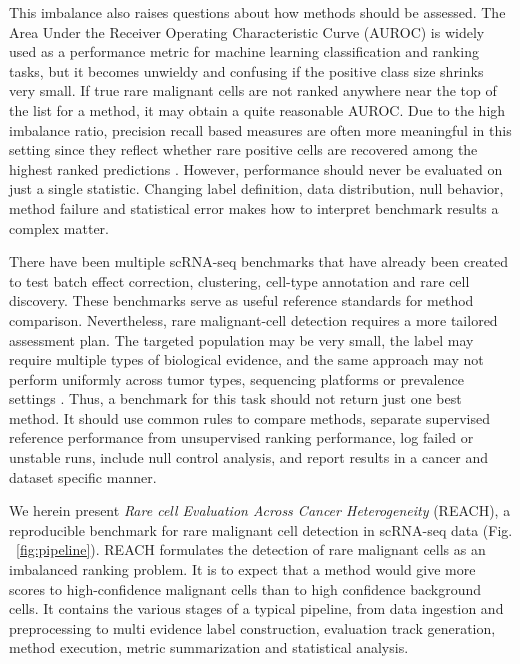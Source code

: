 \documentclass[10pt]{article}
\begin{document}
This imbalance also raises questions about how methods should be assessed. The Area Under the Receiver Operating Characteristic Curve (AUROC) is widely used as a performance metric for machine learning classification and ranking tasks, but it becomes unwieldy and confusing if the positive class size shrinks very small. If true rare malignant cells are not ranked anywhere near the top of the list for a method, it may obtain a quite reasonable AUROC. Due to the high imbalance ratio, precision recall based measures are often more meaningful in this setting since they reflect whether rare positive cells are recovered among the highest ranked predictions \cite{davis2006relationship,saito2015precision}. However, performance should never be evaluated on just a single statistic. Changing label definition, data distribution, null behavior, method failure and statistical error makes how to interpret benchmark results a complex matter.

There have been multiple scRNA-seq benchmarks that have already been created to test batch effect correction, clustering, cell-type annotation and rare cell discovery. These benchmarks serve as useful reference standards for method comparison. Nevertheless, rare malignant-cell detection requires a more tailored assessment plan. The targeted population may be very small, the label may require multiple types of biological evidence, and the same approach may not perform uniformly across tumor types, sequencing platforms or prevalence settings \cite{tran2020benchmark,wang2022comparison,tian2019benchmarking,abdelaal2019comparison}. Thus, a benchmark for this task should not return just one best method. It should use common rules to compare methods, separate supervised reference performance from unsupervised ranking performance, log failed or unstable runs, include null control analysis, and report results in a cancer and dataset specific manner\cite{cao2021benchmark}.

We herein present \textit{Rare cell Evaluation Across Cancer Heterogeneity} (REACH), a reproducible benchmark for rare malignant cell detection in scRNA-seq data (Fig. ~\ref{fig:pipeline}). REACH formulates the detection of rare malignant cells as an imbalanced ranking problem. It is to expect that a method would give more scores to high-confidence malignant cells than to high confidence background cells. It contains the various stages of a typical pipeline, from data ingestion and preprocessing to multi evidence label construction, evaluation track generation, method execution, metric summarization and statistical analysis.
\end{document}

